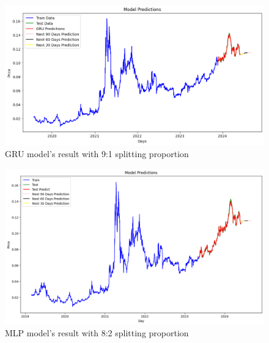 \documentclass{ieeeojies}
\begin{document}
\begin{figure}[H]
  \centering
  \begin{minipage}{0.8\linewidth}
    \centering
    \includegraphics[width=\linewidth]{Image/GRU/GRU_TRON_91_n.png}
    \caption{GRU model's result with 9:1 splitting proportion}
    \label{fig:13}
  \end{minipage}
\end{figure}
\vspace{-8mm}
\begin{figure}[H]
  \centering
  \begin{minipage}{0.8\linewidth}
    \centering
    \includegraphics[width=\linewidth]{Image/MLP/MLP_TRON_82_new.png}
    \caption{MLP model's result with 8:2 splitting proportion}
    \label{fig:14}
  \end{minipage}
\end{figure}
\vspace{-2mm}
\end{document}
